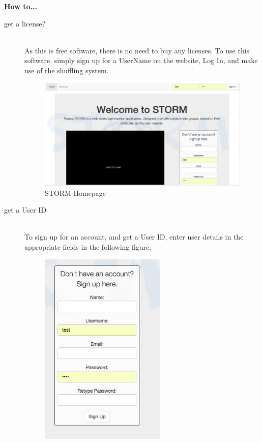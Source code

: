 {\Large \textbf{How to...} \par}

\begin{description}
 	\item[get a license?] \hfill \\
 		As this is free software, there is no need to buy any licenses. To use this software, simply 
		sign up for a UserName on the website, Log In, and make use of the shuffling system.
 		\begin{figure}[H] 
		 	\centering
			 \includegraphics[width=17cm]{./graphics/HomePage.jpg}
			 \caption{STORM Homepage}
		 \end{figure}
\newpage
 	\item[get a User ID] \hfill \\
		To sign up for an account, and get a User ID, enter user details in the appropriate fields in the 		following figure.\par
		 \begin{figure}[H] 
		 \centering
		 \includegraphics[width=6cm]{./graphics/StormUMSU1.jpg}

\end{figure}
\end{description}
